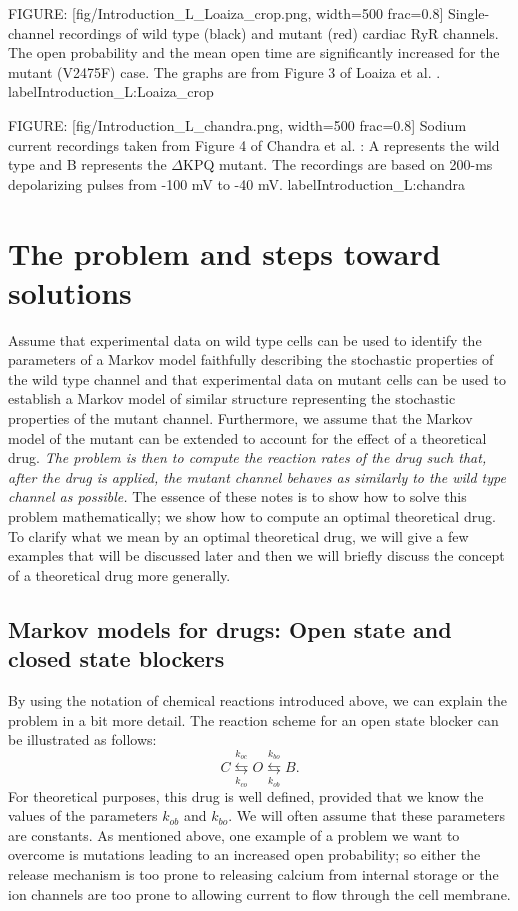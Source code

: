 FIGURE: [fig/Introduction_L_Loaiza_crop.png, width=500 frac=0.8] Single-channel recordings of wild type (black) and mutant (red) cardiac RyR channels. The open probability and the mean open time are significantly increased for the mutant (V2475F) case. The graphs are from Figure 3 of Loaiza et al. \cite{loaiza2013}. label{Introduction_L:Loaiza_crop}

FIGURE: [fig/Introduction_L_chandra.png, width=500 frac=0.8] Sodium current recordings taken from Figure 4 of Chandra et al. \cite{Chandra1998}: A represents the wild type and B represents
the $\Delta$KPQ mutant. The recordings are based on 200-ms depolarizing pulses from -100 mV to -40 mV.  label{Introduction_L:chandra}


\section{The problem and steps toward solutions}

Assume that experimental data on wild type cells can be used to identify the parameters of a Markov model faithfully describing the stochastic properties of the wild type channel and that experimental data on mutant cells can be used to establish a Markov model of similar structure representing the stochastic properties of the mutant channel. Furthermore, we assume that the Markov model of the mutant can be extended to account for the effect of a theoretical drug. {\it The problem is then to compute the reaction rates of the drug such that, after the drug is applied, the mutant channel behaves as similarly to the wild type channel as possible. } The essence of these notes is to show how to solve this problem mathematically; we show how to compute an optimal theoretical drug. To clarify what we mean by an optimal theoretical drug, we will give a few examples that will be discussed later and then we will briefly discuss the concept of a theoretical drug  more generally.

 \subsection{Markov models for drugs: Open state and closed state blockers}
 By using the notation of chemical reactions introduced above, we can explain the problem in a bit more detail. The reaction scheme for an open state blocker can be illustrated as follows:
\begin{equation}
C\underset{ k_{co}}{\overset{k_{oc}}{\leftrightarrows}}O\underset{k_{ob}
}{\overset{k_{bo}}{\leftrightarrows}}B. \label{open_block}
\end{equation}
For theoretical purposes, this drug is well defined, provided that we know the values of the parameters $k_{ob}$ and $k_{bo}$. We will often assume that these parameters are constants. As mentioned above, one example of a problem we want to overcome
is mutations leading to an increased open probability; so either the release mechanism is too prone to releasing calcium from internal storage or the ion channels are too prone to allowing  current to flow through the cell membrane.

